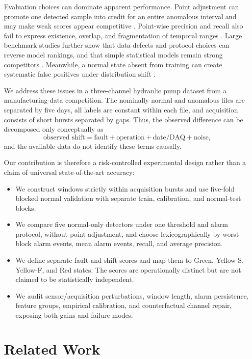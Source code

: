 \documentclass{article}
\begin{document}
Evaluation choices can dominate apparent performance. Point adjustment can promote one detected sample into credit for an entire anomalous interval and may make weak scores appear competitive \cite{kim2022rigorous}. Point-wise precision and recall also fail to express existence, overlap, and fragmentation of temporal ranges \cite{tatbul2018precision}. Large benchmark studies further show that data defects and protocol choices can reverse model rankings, and that simple statistical models remain strong competitors \cite{liu2024elephant}. Meanwhile, a normal state absent from training can create systematic false positives under distribution shift \cite{kim2024newnormals}.

We address these issues in a three-channel hydraulic pump dataset from a manufacturing-data competition. The nominally normal and anomalous files are separated by five days, all labels are constant within each file, and acquisition consists of short bursts separated by gaps. Thus, the observed difference can be decomposed only conceptually as
\begin{equation}
\text{observed shift}=\text{fault}+\text{operation}+\text{date/DAQ}+\text{noise},
\end{equation}
and the available data do not identify these terms causally.

Our contribution is therefore a risk-controlled experimental design rather than a claim of universal state-of-the-art accuracy:
\begin{itemize}
  \item We construct windows strictly within acquisition bursts and use five-fold blocked normal validation with separate train, calibration, and normal-test blocks.
  \item We compare five normal-only detectors under one threshold and alarm protocol, without point adjustment, and choose lexicographically by worst-block alarm events, mean alarm events, recall, and average precision.
  \item We define separate fault and shift scores and map them to Green, Yellow-S, Yellow-F, and Red states. The scores are operationally distinct but are not claimed to be statistically independent.
  \item We audit sensor/acquisition perturbations, window length, alarm persistence, feature groups, empirical calibration, and counterfactual channel repair, exposing both gains and failure modes.
\end{itemize}

\section{Related Work}
\end{document}
